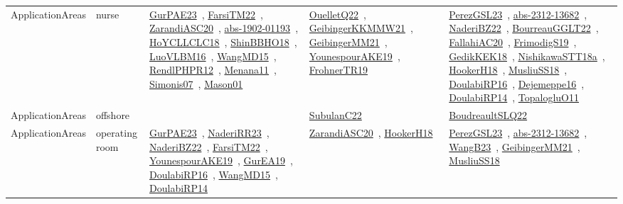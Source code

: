 {\begin{longtable}{lp{3cm}>{\raggedright\arraybackslash}p{6cm}>{\raggedright\arraybackslash}p{6cm}>{\raggedright\arraybackslash}p{8cm}}
ApplicationAreas & nurse & \href{works/GurPAE23.pdf}{GurPAE23}~\cite{GurPAE23}, \href{works/FarsiTM22.pdf}{FarsiTM22}~\cite{FarsiTM22}, \href{works/ZarandiASC20.pdf}{ZarandiASC20}~\cite{ZarandiASC20}, \href{works/abs-1902-01193.pdf}{abs-1902-01193}~\cite{abs-1902-01193}, \href{works/HoYCLLCLC18.pdf}{HoYCLLCLC18}~\cite{HoYCLLCLC18}, \href{works/ShinBBHO18.pdf}{ShinBBHO18}~\cite{ShinBBHO18}, \href{works/LuoVLBM16.pdf}{LuoVLBM16}~\cite{LuoVLBM16}, \href{works/WangMD15.pdf}{WangMD15}~\cite{WangMD15}, \href{works/RendlPHPR12.pdf}{RendlPHPR12}~\cite{RendlPHPR12}, \href{works/Menana11.pdf}{Menana11}~\cite{Menana11}, \href{works/Simonis07.pdf}{Simonis07}~\cite{Simonis07}, \href{works/Mason01.pdf}{Mason01}~\cite{Mason01} & \href{works/OuelletQ22.pdf}{OuelletQ22}~\cite{OuelletQ22}, \href{works/GeibingerKKMMW21.pdf}{GeibingerKKMMW21}~\cite{GeibingerKKMMW21}, \href{works/GeibingerMM21.pdf}{GeibingerMM21}~\cite{GeibingerMM21}, \href{works/YounespourAKE19.pdf}{YounespourAKE19}~\cite{YounespourAKE19}, \href{works/FrohnerTR19.pdf}{FrohnerTR19}~\cite{FrohnerTR19} & \href{works/PerezGSL23.pdf}{PerezGSL23}~\cite{PerezGSL23}, \href{works/abs-2312-13682.pdf}{abs-2312-13682}~\cite{abs-2312-13682}, \href{works/NaderiBZ22.pdf}{NaderiBZ22}~\cite{NaderiBZ22}, \href{works/BourreauGGLT22.pdf}{BourreauGGLT22}~\cite{BourreauGGLT22}, \href{works/FallahiAC20.pdf}{FallahiAC20}~\cite{FallahiAC20}, \href{works/FrimodigS19.pdf}{FrimodigS19}~\cite{FrimodigS19}, \href{works/GedikKEK18.pdf}{GedikKEK18}~\cite{GedikKEK18}, \href{works/NishikawaSTT18a.pdf}{NishikawaSTT18a}~\cite{NishikawaSTT18a}, \href{works/HookerH18.pdf}{HookerH18}~\cite{HookerH18}, \href{works/MusliuSS18.pdf}{MusliuSS18}~\cite{MusliuSS18}, \href{works/DoulabiRP16.pdf}{DoulabiRP16}~\cite{DoulabiRP16}, \href{works/Dejemeppe16.pdf}{Dejemeppe16}~\cite{Dejemeppe16}, \href{works/DoulabiRP14.pdf}{DoulabiRP14}~\cite{DoulabiRP14}, \href{works/TopalogluO11.pdf}{TopalogluO11}~\cite{TopalogluO11}\\
ApplicationAreas & offshore &  & \href{works/SubulanC22.pdf}{SubulanC22}~\cite{SubulanC22} & \href{works/BoudreaultSLQ22.pdf}{BoudreaultSLQ22}~\cite{BoudreaultSLQ22}\\
ApplicationAreas & operating room & \href{works/GurPAE23.pdf}{GurPAE23}~\cite{GurPAE23}, \href{works/NaderiRR23.pdf}{NaderiRR23}~\cite{NaderiRR23}, \href{works/NaderiBZ22.pdf}{NaderiBZ22}~\cite{NaderiBZ22}, \href{works/FarsiTM22.pdf}{FarsiTM22}~\cite{FarsiTM22}, \href{works/YounespourAKE19.pdf}{YounespourAKE19}~\cite{YounespourAKE19}, \href{works/GurEA19.pdf}{GurEA19}~\cite{GurEA19}, \href{works/DoulabiRP16.pdf}{DoulabiRP16}~\cite{DoulabiRP16}, \href{works/WangMD15.pdf}{WangMD15}~\cite{WangMD15}, \href{works/DoulabiRP14.pdf}{DoulabiRP14}~\cite{DoulabiRP14} & \href{works/ZarandiASC20.pdf}{ZarandiASC20}~\cite{ZarandiASC20}, \href{works/HookerH18.pdf}{HookerH18}~\cite{HookerH18} & \href{works/PerezGSL23.pdf}{PerezGSL23}~\cite{PerezGSL23}, \href{works/abs-2312-13682.pdf}{abs-2312-13682}~\cite{abs-2312-13682}, \href{works/WangB23.pdf}{WangB23}~\cite{WangB23}, \href{works/GeibingerMM21.pdf}{GeibingerMM21}~\cite{GeibingerMM21}, \href{works/MusliuSS18.pdf}{MusliuSS18}~\cite{MusliuSS18}\\

\end{longtable}}
